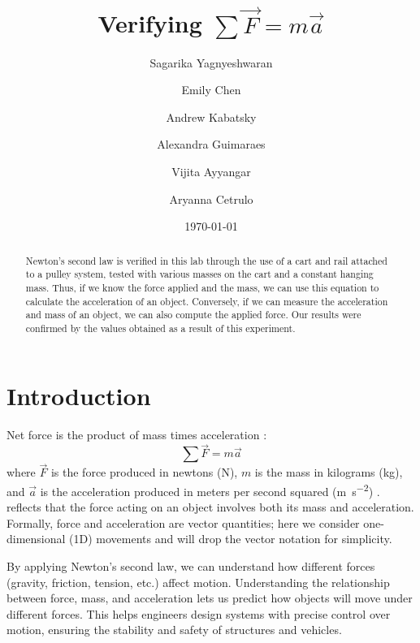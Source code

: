 \documentclass[reprint,amsmath,amssymb,aps]{revtex4-2}
\begin{document}
\title{Verifying $\sum\vec{F} = m\vec{a}$}

\author{Sagarika Yagnyeshwaran}
\author{Emily Chen}
\author{Andrew Kabatsky}
\author{Alexandra Guimaraes}
\author{Vijita Ayyangar}
\author{Aryanna Cetrulo}
\date{\today}

\begin{abstract}
Newton’s second law is verified in this lab through the use of a cart and rail attached to a pulley system, tested with various masses on the cart and a constant hanging mass. Thus, if we know the force applied and the mass, we can use this equation to calculate the acceleration of an object. Conversely, if we can measure the acceleration and mass of an object, we can also compute the applied force. Our results were confirmed by the values obtained as a result of this experiment.
\end{abstract}


\maketitle





\section{Introduction}
Net force is the product of mass times acceleration \cite{newton1687principia}:
\begin{equation} 
\sum \vec{F} = m\vec{a}
\label{eq:1}
\end{equation}
where $\vec{F}$ is the force produced in newtons (\unit{\newton}), $m$ is the mass in kilograms (\unit{\kilo\gram}), and $\vec{a}$ is the acceleration produced in meters per second squared (\unit{\meter\per\second\squared}) \cite{newton1687principia}.  reflects that the force acting on an object involves both its mass and acceleration. Formally, force and acceleration are vector quantities; here we consider one-dimensional (1D) movements and will drop the vector notation for simplicity. 

By applying Newton's second law, we can understand how different forces (gravity, friction, tension, etc.) affect motion. Understanding the relationship between force, mass, and acceleration lets us predict how objects will move under different forces. This helps engineers design systems with precise control over motion, ensuring the stability and safety of structures and vehicles.
\end{document}
